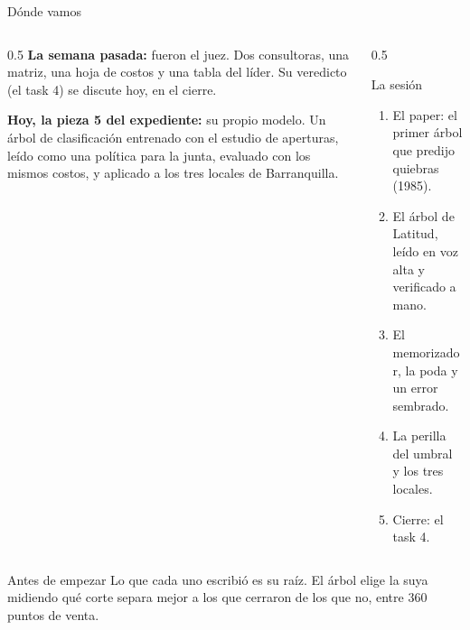 \documentclass{beamer}
\begin{document}
\begin{frame}
\titlepage
\end{frame}

\begin{frame}{Dónde vamos}
\begin{columns}[T]
\begin{column}{0.5\textwidth}
\textbf{La semana pasada:} fueron el juez. Dos consultoras, una matriz, una hoja de costos y una tabla del líder. Su veredicto (el task 4) se discute hoy, en el cierre.

\medskip
\textbf{Hoy, la pieza 5 del expediente:} su propio modelo. Un árbol de clasificación entrenado con el estudio de aperturas, leído como una política para la junta, evaluado con los mismos costos, y aplicado a los tres locales de Barranquilla.
\end{column}
\begin{column}{0.5\textwidth}
\begin{block}{La sesión}
\begin{enumerate}
  \item El paper: el primer árbol que predijo quiebras (1985).
  \item El árbol de Latitud, leído en voz alta y verificado a mano.
  \item El memorizador, la poda y un error sembrado.
  \item La perilla del umbral y los tres locales.
  \item Cierre: el task 4.
\end{enumerate}
\end{block}
\end{column}
\end{columns}
\end{frame}

\begin{frame}{Antes de empezar}
\medskip
\small Lo que cada uno escribió es su raíz. El árbol elige la suya midiendo qué corte separa mejor a los que cerraron de los que no, entre 360 puntos de venta.
\end{frame}
\end{document}
